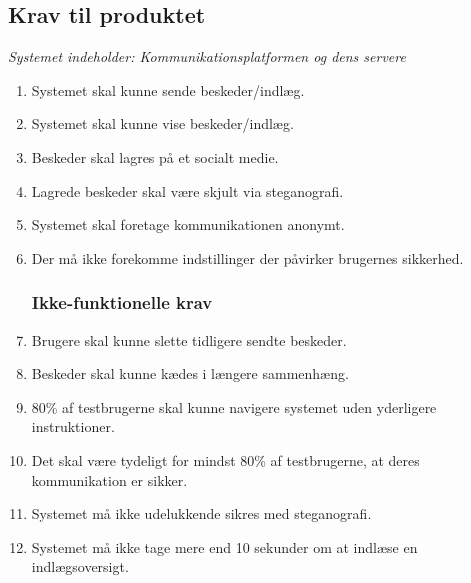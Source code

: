 \subsection{Krav til produktet}
\textit{Systemet indeholder: Kommunikationsplatformen og dens servere}
\begin{enumerate}[label=\textbf{Krav. \arabic*},leftmargin=.85in]
    \subsubsection{Funktionelle krav}
    \label{funktion}
    \item \label{k:send} Systemet skal kunne sende beskeder/indlæg.
    \item \label{k:vise} Systemet skal kunne vise beskeder/indlæg.
    \item \label{k:lagre} Beskeder skal lagres på et socialt medie.
    \item \label{k:stegano} Lagrede beskeder skal være skjult via steganografi.
    \item \label{k:anonymt} Systemet skal foretage kommunikationen anonymt.
    \item \label{k:indstil} Der må ikke forekomme indstillinger der påvirker brugernes sikkerhed.
    \subsubsection{Ikke-funktionelle krav}
    \label{ikke-funktion}
    \item \label{k:slette} Brugere skal kunne slette tidligere sendte beskeder.
    \item \label{k:sammen} Beskeder skal kunne kædes i længere sammenhæng.
    \item \label{k:naviger} 80\% af testbrugerne skal kunne navigere systemet uden yderligere instruktioner.
    \item \label{k:sikker} Det skal være tydeligt for mindst 80\% af testbrugerne, at deres kommunikation er sikker.
    \item \label{k:krypto} Systemet må ikke udelukkende sikres med steganografi.
    \item \label{k:load} Systemet må ikke tage mere end 10 sekunder om at indlæse en indlægsoversigt.
\end{enumerate}